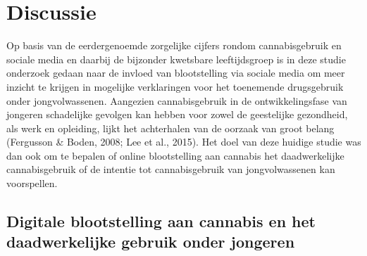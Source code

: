 \documentclass[
  letterpaper,
  DIV=11,
  numbers=noendperiod]{scrartcl}
\begin{document}
\hypertarget{discussie}{%
\section{Discussie}\label{discussie}}

Op basis van de eerdergenoemde zorgelijke cijfers rondom cannabisgebruik
en sociale media en daarbij de bijzonder kwetsbare leeftijdsgroep is in
deze studie onderzoek gedaan naar de invloed van blootstelling via
sociale media om meer inzicht te krijgen in mogelijke verklaringen voor
het toenemende drugsgebruik onder jongvolwassenen. Aangezien
cannabisgebruik in de ontwikkelingsfase van jongeren schadelijke
gevolgen kan hebben voor zowel de geestelijke gezondheid, als werk en
opleiding, lijkt het achterhalen van de oorzaak van groot belang
(Fergusson \& Boden, 2008; Lee et al., 2015). Het doel van deze huidige
studie was dan ook om te bepalen of online blootstelling aan cannabis
het daadwerkelijke cannabisgebruik of de intentie tot cannabisgebruik
van jongvolwassenen kan voorspellen.

\hypertarget{digitale-blootstelling-aan-cannabis-en-het-daadwerkelijke-gebruik-onder-jongeren-1}{%
\subsection{Digitale blootstelling aan cannabis en het daadwerkelijke
gebruik onder
jongeren}\label{digitale-blootstelling-aan-cannabis-en-het-daadwerkelijke-gebruik-onder-jongeren-1}}
\end{document}

